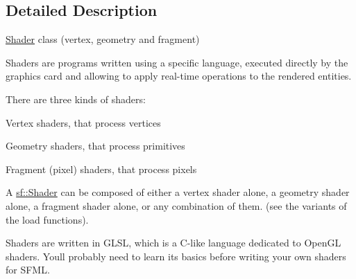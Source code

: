 \subsection{Detailed Description}
\mbox{\hyperlink{classsf_1_1_shader}{Shader}} class (vertex, geometry and fragment) 

\begin{DoxyVerb}\end{DoxyVerb}


Shaders are programs written using a specific language, executed directly by the graphics card and allowing to apply real-\/time operations to the rendered entities.

There are three kinds of shaders\+: \begin{DoxyItemize}
\item Vertex shaders, that process vertices \item Geometry shaders, that process primitives \item Fragment (pixel) shaders, that process pixels\end{DoxyItemize}
A \mbox{\hyperlink{classsf_1_1_shader}{sf\+::\+Shader}} can be composed of either a vertex shader alone, a geometry shader alone, a fragment shader alone, or any combination of them. (see the variants of the load functions).

Shaders are written in G\+L\+SL, which is a C-\/like language dedicated to Open\+GL shaders. You\textquotesingle{}ll probably need to learn its basics before writing your own shaders for S\+F\+ML.

